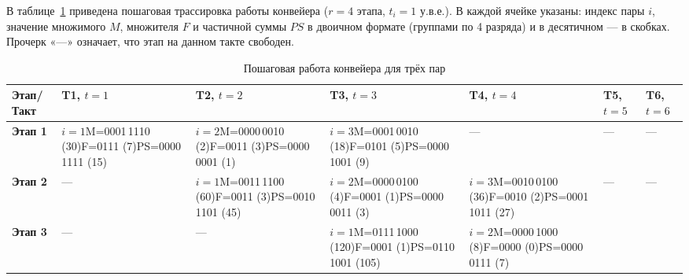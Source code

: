 \documentclass[12pt,a4paper]{article}
\begin{document}
В таблице~\ref{tab:trace} приведена пошаговая трассировка работы
конвейера ($r = 4$ этапа, $t_i = 1$ у.в.е.). В каждой ячейке
указаны: индекс пары $i$, значение множимого $M$, множителя $F$
и частичной суммы $PS$ в двоичном формате (группами по 4 разряда)
и в десятичном — в скобках. Прочерк «---» означает, что этап
на данном такте свободен.

\begin{landscape}
\begin{table}[h!]
\centering
\caption{Пошаговая работа конвейера для трёх пар}
\label{tab:trace}
\scriptsize
\begin{tabular}{|l|p{3.1cm}|p{3.1cm}|p{3.1cm}|p{3.1cm}|p{3.1cm}|p{3.1cm}|}
\hline
\textbf{Этап/Такт}
 & \textbf{T1}, $t{=}1$
 & \textbf{T2}, $t{=}2$
 & \textbf{T3}, $t{=}3$
 & \textbf{T4}, $t{=}4$
 & \textbf{T5}, $t{=}5$
 & \textbf{T6}, $t{=}6$ \\
\hline
\textbf{Этап 1}
 & $i{=}1$\newline M=0001\,1110 (30)\newline F=0111 (7)\newline PS=0000\,1111 (15)
 & $i{=}2$\newline M=0000\,0010 (2)\newline F=0011 (3)\newline PS=0000\,0001 (1)
 & $i{=}3$\newline M=0001\,0010 (18)\newline F=0101 (5)\newline PS=0000\,1001 (9)
 & ---
 & ---
 & --- \\
\hline
\textbf{Этап 2}
 & ---
 & $i{=}1$\newline M=0011\,1100 (60)\newline F=0011 (3)\newline PS=0010\,1101 (45)
 & $i{=}2$\newline M=0000\,0100 (4)\newline F=0001 (1)\newline PS=0000\,0011 (3)
 & $i{=}3$\newline M=0010\,0100 (36)\newline F=0010 (2)\newline PS=0001\,1011 (27)
 & ---
 & --- \\
\hline
\textbf{Этап 3}
 & ---
 & ---
 & $i{=}1$\newline M=0111\,1000 (120)\newline F=0001 (1)\newline PS=0110\,1001 (105)
 & $i{=}2$\newline M=0000\,1000 (8)\newline F=0000 (0)\newline PS=0000\,0111 (7)

\end{tabular}
\end{table}
\end{landscape}
\end{document}
